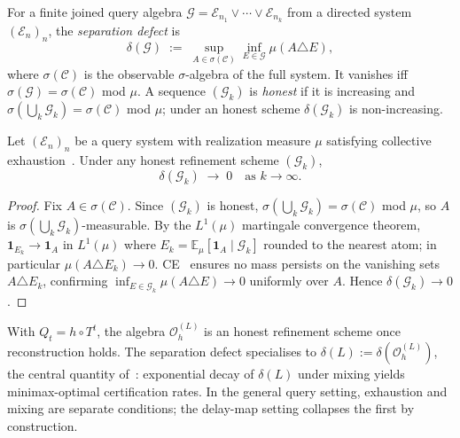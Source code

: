 For a finite joined query algebra $\mathcal{G} = \mathcal{E}_{n_1} \vee \cdots
\vee \mathcal{E}_{n_k}$ from a directed system $(\mathcal{E}_n)_n$, the
\emph{separation defect} is
\[
  \delta(\mathcal{G})
  \;:=\;
  \sup_{A \in \sigma(\mathcal{C})} \inf_{E \in \mathcal{G}} \mu(A \triangle E),
\]
where $\sigma(\mathcal{C})$ is the observable $\sigma$-algebra of the full
system.  It vanishes iff $\sigma(\mathcal{G}) = \sigma(\mathcal{C})$ mod $\mu$.
A sequence $(\mathcal{G}_k)$ is \emph{honest} if it is increasing and
$\sigma(\bigcup_k \mathcal{G}_k) = \sigma(\mathcal{C})$ mod $\mu$; under an
honest scheme $\delta(\mathcal{G}_k)$ is non-increasing.

\begin{theorem}
\label{II:thm:ce-sep-defect}
Let $(\mathcal{E}_n)_n$ be a query system with realization measure $\mu$
satisfying collective exhaustion~\cite{mahon_paper1}.  Under any honest
refinement scheme $(\mathcal{G}_k)$,
\[
  \delta(\mathcal{G}_k) \;\longrightarrow\; 0
  \quad \text{as } k \to \infty.
\]
\end{theorem}

\begin{proof}
Fix $A \in \sigma(\mathcal{C})$.  Since $(\mathcal{G}_k)$ is honest,
$\sigma(\bigcup_k \mathcal{G}_k) = \sigma(\mathcal{C})$ mod $\mu$, so $A$
is $\sigma(\bigcup_k \mathcal{G}_k)$-measurable.  By the $L^1(\mu)$
martingale convergence theorem, $\mathbf{1}_{E_k} \to \mathbf{1}_A$ in
$L^1(\mu)$ where $E_k = \mathbb{E}_\mu[\mathbf{1}_A \mid \mathcal{G}_k]$
rounded to the nearest atom; in particular $\mu(A \triangle E_k) \to 0$.
CE~\cite{mahon_paper1} ensures no mass persists on the vanishing sets
$A \triangle E_k$, confirming $\inf_{E \in \mathcal{G}_k}\mu(A \triangle E)
\to 0$ uniformly over $A$.  Hence $\delta(\mathcal{G}_k) \to 0$.
\end{proof}

\begin{remark}
\label{II:rem:temporal-spec}
With $Q_t = h \circ T^t$, the algebra $\mathcal{O}_h^{(L)}$ is an honest
refinement scheme once reconstruction holds.
The separation defect specialises to $\delta(L) := \delta(\mathcal{O}_h^{(L)})$,
the central quantity of~\cite{mahon_paper3}: exponential decay of $\delta(L)$
under mixing yields minimax-optimal certification rates.  In the general
query setting, exhaustion and mixing are separate conditions; the delay-map
setting collapses the first by construction.
\end{remark}


